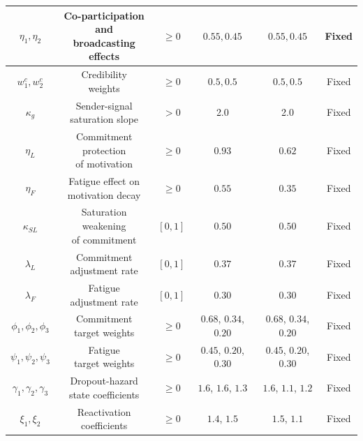 \documentclass[11pt]{article}
\begin{document}
\begin{longtable}[c]{|c|c|c|c|c|c|}
         \hline
         $\eta_1, \eta_2$&  \makecell{Co-participation and\\broadcasting effects}&  $\ge0$&  $0.55, 0.45$&  $0.55, 0.45$& Fixed\\
         \hline
         $w_1^c, w_2^c$&  \makecell{Credibility\\weights}&  $\ge0$&  $0.5, 0.5$&  $0.5, 0.5$& Fixed\\
         \hline
         $\kappa_g$&  \makecell{Sender-signal\\saturation slope}&  $>0$&  2.0&  2.0& Fixed\\
         \hline
         $\eta_L$&  \makecell{Commitment\\protection\\of motivation}&  $\ge0$&  $0.93$&  $0.62$& Fixed\\
         \hline
         $\eta_F$&  \makecell{Fatigue effect on\\motivation decay}&  $\ge0$&  $0.55$&  $0.35$& Fixed\\
         \hline
         $\kappa_{SL}$&  \makecell{Saturation\\weakening\\of commitment}&  $[0,1]$&  $0.50$&  $0.50$& Fixed\\
         \hline
         $\lambda_L$&  \makecell{Commitment\\adjustment rate}&  $[0,1]$&  $0.37$&  $0.37$& Fixed\\
         \hline
         $\lambda_F$&  \makecell{Fatigue\\adjustment rate}&  $[0,1]$&  $0.30$&  $0.30$& Fixed\\
         \hline
         $\phi_1, \phi_2, \phi_3$&  \makecell{Commitment\\target weights}&  $\ge0$&  $0.68$, $0.34$, $0.20$&  $0.68$, $0.34$, $0.20$& Fixed\\
         \hline
         $\psi_1, \psi_2, \psi_3$&  \makecell{Fatigue\\target weights}&  $\ge0$&  $0.45$, $0.20$, $0.30$&  $0.45$, $0.20$, $0.30$& Fixed\\
         \hline
         $\gamma_1, \gamma_2, \gamma_3$&  \makecell{Dropout-hazard\\state coefficients}&  $\ge0$&  $1.6$, $1.6$, $1.3$&  $1.6$, $1.1$, $1.2$& Fixed\\
         \hline
         $\xi_1, \xi_2$&  \makecell{Reactivation\\coefficients}&  $\ge0$&  $1.4$, $1.5$&  $1.5$, $1.1$& Fixed\\

\end{longtable}
\end{document}
